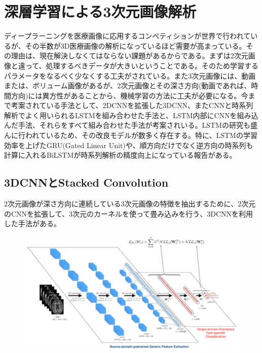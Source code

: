 \section{深層学習による3次元画像解析}
ディープラーニングを医療画像に応用するコンペティションが世界で行われているが、その半数が3D医療画像の解析になっているほど需要が高まっている。その理由は、現在解決しなくてはならない課題があるからである。まずは2次元画像と違って、処理するべきデータが大きいということである。そのため学習するパラメータをなるべく少なくする工夫がされている。また3次元画像には、動画または、ボリューム画像があるが、2次元画像とその深さ方向(動画であれば、時間方向)には異方性があることから、機械学習の方法に工夫が必要になる。今まで考案されている手法として、2DCNNを拡張した3DCNN、またCNNと時系列解析でよく用いられるLSTMを組み合わせた手法と、LSTM内部にCNNを組み込んだ手法、それらをすべて組み合わせた手法が考案されいる。LSTMの研究も盛んに行われているため、その改良モデルが数多く存在する。特に、LSTMの学習効率を上げたGRU(Gated Linear Unit)や、順方向だけでなく逆方向の時系列も計算に入れるBiLSTMが時系列解析の精度向上になっている報告がある。


\subsection{3DCNNとStacked Convolution}
2次元画像が深さ方向に連続している3次元画像の特徴を抽出するために、2次元のCNNを拡張して、3次元のカーネルを使って畳み込みを行う、3DCNNを利用した手法がある。

\begin{figure}[h]
\centering
\includegraphics[width=0.7\linewidth]{fig/3d_cnn.png}
\caption{}
\label{fig:}
\end{figure}


